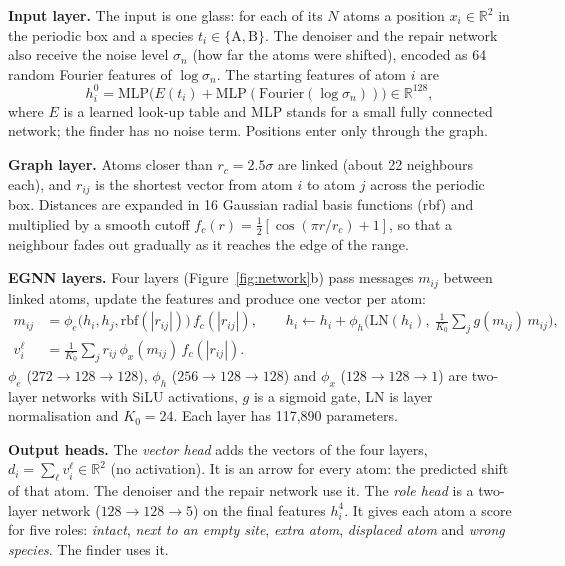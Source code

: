 \documentclass[10pt]{article}
\begin{document}
\textbf{Input layer.} The input is one glass: for each of its $N$ atoms a position $x_i\in\mathbb{R}^2$ in the periodic box and a species $t_i\in\{\mathrm{A},\mathrm{B}\}$. The denoiser and the repair network also receive the noise level $\sigma_n$ (how far the atoms were shifted), encoded as 64 random Fourier features of $\log\sigma_n$. The starting features of atom $i$ are
\begin{equation}
h_i^0=\mathrm{MLP}\big(E(t_i)+\mathrm{MLP}(\mathrm{Fourier}(\log\sigma_n))\big)\in\mathbb{R}^{128},
\end{equation}
where $E$ is a learned look-up table and MLP stands for a small fully connected network; the finder has no noise term. Positions enter only through the graph.

\textbf{Graph layer.} Atoms closer than $r_c=2.5\sigma$ are linked (about 22 neighbours each), and $r_{ij}$ is the shortest vector from atom $i$ to atom $j$ across the periodic box. Distances are expanded in 16 Gaussian radial basis functions (rbf) and multiplied by a smooth cutoff $f_c(r)=\tfrac12[\cos(\pi r/r_c)+1]$, so that a neighbour fades out gradually as it reaches the edge of the range.

\textbf{EGNN layers.} Four layers (Figure~\ref{fig:network}b) pass messages $m_{ij}$ between linked atoms, update the features and produce one vector per atom:
\begin{equation}
\begin{aligned}
m_{ij} &= \phi_e\big(h_i,h_j,\mathrm{rbf}(|r_{ij}|)\big)\,f_c(|r_{ij}|), \qquad
h_i \leftarrow h_i+\phi_h\Big(\mathrm{LN}(h_i),\ \tfrac{1}{K_0}\textstyle\sum_j g(m_{ij})\,m_{ij}\Big),\\
v_i^{\ell} &= \tfrac{1}{K_0}\textstyle\sum_j r_{ij}\,\phi_x(m_{ij})\,f_c(|r_{ij}|).
\end{aligned}
\label{eq:layer}
\end{equation}
$\phi_e$ ($272\to128\to128$), $\phi_h$ ($256\to128\to128$) and $\phi_x$ ($128\to128\to1$) are two-layer networks with SiLU activations, $g$ is a sigmoid gate, LN is layer normalisation and $K_0=24$. Each layer has 117,890 parameters.

\textbf{Output heads.} The \emph{vector head} adds the vectors of the four layers, $d_i=\sum_\ell v_i^\ell\in\mathbb{R}^2$ (no activation). It is an arrow for every atom: the predicted shift of that atom. The denoiser and the repair network use it. The \emph{role head} is a two-layer network ($128\to128\to5$) on the final features $h_i^4$. It gives each atom a score for five roles: \emph{intact}, \emph{next to an empty site}, \emph{extra atom}, \emph{displaced atom} and \emph{wrong species}. The finder uses it.
\end{document}
